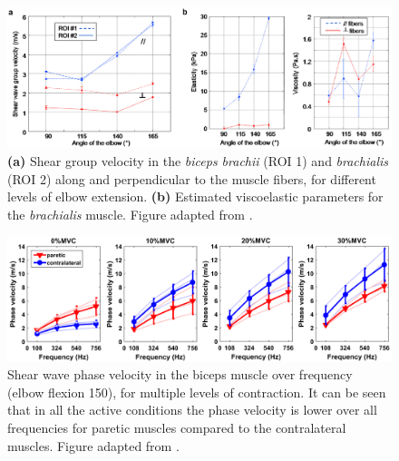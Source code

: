 


\begin{figure}[t]
	\centering
	\includegraphics[width=.95\linewidth]{Figures/elastography/gennisson_dispersion_passive.png}
	\caption{\textbf{(a)} Shear group velocity in the  \textit{biceps brachii} (ROI 1) and \textit{brachialis} (ROI 2) along and perpendicular to the muscle fibers, for different levels of elbow extension. \textbf{(b)} Estimated viscoelastic parameters for the \textit{brachialis} muscle. Figure adapted from \citet{gennisson_viscoelastic_2010}.}
	\label{fig:rem_gennisson_dispersion_passive}
\end{figure}

\begin{figure}[t]
	\centering
	\includegraphics[width=.95\linewidth]{Figures/elastography/saadat_dispersion_paretic.png}
	\caption{Shear wave phase velocity in the biceps muscle over frequency (elbow flexion \SI{150}{\deg}), for multiple levels of contraction. It can be seen that in all the active conditions the phase velocity is lower over all frequencies for paretic muscles compared to the contralateral muscles. Figure adapted from \citet{saadat_frequency_2018}.}
	\label{fig:saadat_dispersion_paretic}
\end{figure}


